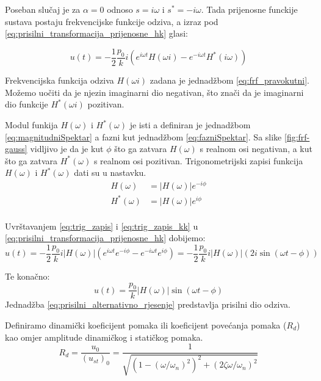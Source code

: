 Poseban slučaj je za $\alpha = 0$ odnoso $s=i\omega \text{ i } s^*=-i\omega$. Tada
prijenosne funckije sustava postaju frekvencijske funkcije odziva, a izraz pod
\eqref{eq:prisilni_transformacija_prijenosne_hk} glasi:

\begin{equation}\label{eq:prisilni_transformacija_frf}
    u(t) = -\frac{1}{2}\frac{p_0}{k}i(e^{i\omega t}H(\omega i) - e^{-i\omega t}H^*(i\omega))
\end{equation}

Frekvencijska funkcija odziva $H(\omega i)$ zadana je jednadžbom \eqref{eq:frf_pravokutni}.
Možemo uočiti da je njezin imaginarni dio negativan, što znači da je imaginarni dio
funkcije $H^*(\omega i)$ pozitivan.

Modul funkija $H(\omega)$ i $H^*(\omega)$ je isti a definiran je jednadžbom
\eqref{eq:magnitudniSpektar} a fazni kut jednadžbom \eqref{eq:fazniSpektar}. Sa
slike \ref{fig:frf-gauss} vidljivo je da je kut $\phi$ što ga zatvara $H(\omega)$ s
realnom osi negativan, a kut što ga zatvara $H^*(\omega)$ s realnom osi pozitivan.
Trigonometrijski zapisi funkcija $H(\omega) \text{ i } H^*(\omega)$ dati su u
nastavku.
\begin{align}
    H(\omega) &= |H(\omega)|e^{-i\phi} \label{eq:trig_zapis}\\
    H^*(\omega) &= |H(\omega)|e^{i\phi} \label{eq:trik_zapis_hk}\\ %
\end{align}

Uvrštavanjem \eqref{eq:trig_zapis} i \eqref{eq:trig_zapis_kk} u \eqref{eq:prisilni_transformacija_prijenosne_hk}
dobijemo:
\begin{equation}
    u(t)=-\frac{1}{2}\frac{p_0}{k}i|H(\omega)|(e^{i\omega t}e^{-i\phi}-e^{-i\omega t}e^{i\phi})
        =-\frac{1}{2}\frac{p_0}{k}i|H(\omega)|(2i\sin(\omega t -\phi))
\end{equation}

Te konačno:
\begin{equation}\label{eq:prisilni_alternativno_rjesenje}
    u(t)=\frac{p_0}{k}|H(\omega)|\sin(\omega t - \phi)
\end{equation}
Jednadžba \eqref{eq:prisilni_alternativno_rjesenje} predstavlja prisilni dio odziva.

Definiramo dinamički koeficijent pomaka ili koeficijent povećanja pomaka ($R_d$) kao omjer
amplitude dinamičkog i statičkog pomaka.
\begin{equation}\label{eq:R_d-izvod-konacno}
    R_d = \frac{u_0}{(u_{st})_0}=\frac{1}{\sqrt{(1-(\omega/\omega_n)^2)^2+(2\zeta\omega/\omega_n)^2}}
\end{equation}

